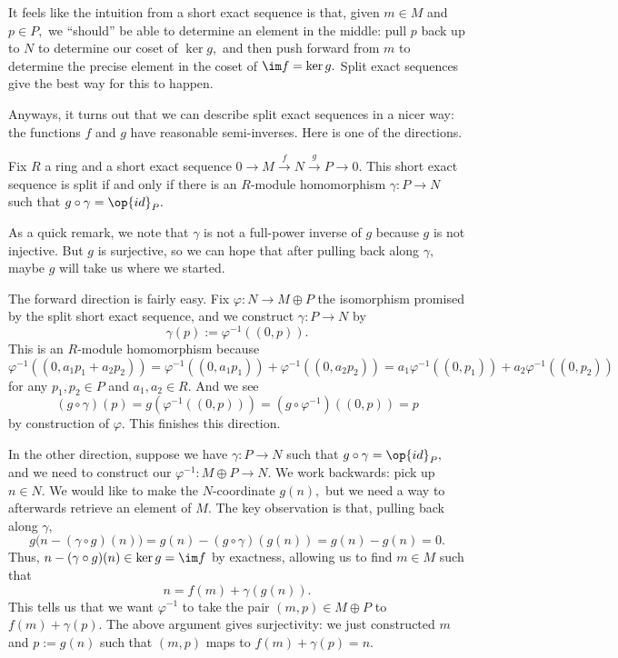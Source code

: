 It feels like the intuition from a short exact sequence is that, given $m\in M$ and $p\in P,$ we ``should'' be able to determine an element in the middle: pull $p$ back up to $N$ to determine our coset of $\ker g,$ and then push forward from $m$ to determine the precise element in the coset of $\im f=\ker g.$ Split exact sequences give the best way for this to happen.

Anyways, it turns out that we can describe split exact sequences in a nicer way: the functions $f$ and $g$ have reasonable semi-inverses. Here is one of the directions.
\begin{proposition}
    Fix $R$ a ring and a short exact sequence $0\to M\stackrel f\to N\stackrel g\to P\to0.$ This short exact sequence is split if and only if there is an $R$-module homomorphism $\gamma:P\to N$ such that $g\circ\gamma=\op{id}_P.$
\end{proposition}
As a quick remark, we note that $\gamma$ is not a full-power inverse of $g$ because $g$ is not injective. But $g$ is surjective, so we can hope that after pulling back along $\gamma,$ maybe $g$ will take us where we started.

The forward direction is fairly easy. Fix $\varphi:N\to M\oplus P$ the isomorphism promised by the split short exact sequence, and we construct $\gamma:P\to N$ by
\[\gamma(p):=\varphi^{-1}((0,p)).\]
This is an $R$-module homomorphism because 
\[\varphi^{-1}((0,a_1p_1+a_2p_2))=\varphi^{-1}((0,a_1p_1))+\varphi^{-1}((0,a_2p_2))=a_1\varphi^{-1}((0,p_1))+a_2\varphi^{-1}((0,p_2))\]
for any $p_1,p_2\in P$ and $a_1,a_2\in R.$ And we see
\[(g\circ\gamma)(p)=g\left(\varphi^{-1}((0,p))\right)=\left(g\circ\varphi^{-1}\right)((0,p))=p\]
by construction of $\varphi.$ This finishes this direction.

In the other direction, suppose we have $\gamma:P\to N$ such that $g\circ\gamma=\op{id}_P,$ and we need to construct our $\varphi^{-1}:M\oplus P\to N.$ We work backwards: pick up $n\in N.$ We would like to make the $N$-coordinate $g(n),$ but we need a way to afterwards retrieve an element of $M.$ The key observation is that, pulling back along $\gamma,$
\[g\big(n-(\gamma\circ g)(n)\big)=g(n)-(g\circ\gamma)(g(n))=g(n)-g(n)=0.\]
Thus, $n-(\gamma\circ g)(n)\in\ker g=\im f$ by exactness, allowing us to find $m\in M$ such that
\[n=f(m)+\gamma(g(n)).\]
This tells us that we want $\varphi^{-1}$ to take the pair $(m,p)\in M\oplus P$ to $f(m)+\gamma(p).$ The above argument gives surjectivity: we just constructed $m$ and $p:=g(n)$ such that $(m,p)$ maps to $f(m)+\gamma(p)=n.$

